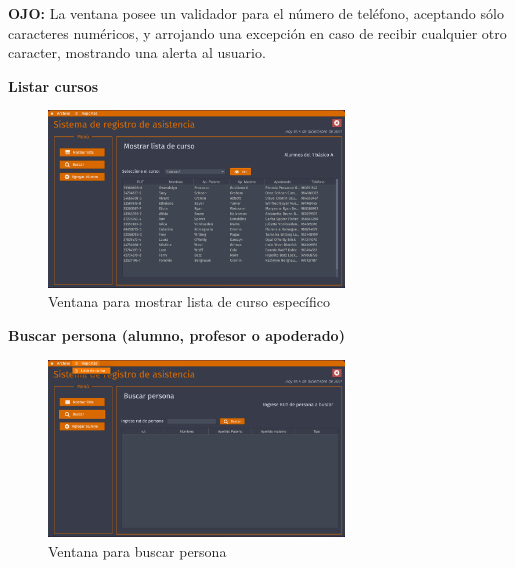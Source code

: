 \textbf{OJO:} La ventana posee un validador para el número de teléfono, aceptando sólo caracteres numéricos, y arrojando una excepción en caso de recibir cualquier otro caracter, mostrando una alerta al usuario.


\clearpage

\textbf{Listar cursos}

\begin{figure}[h]
    \centering
    \includegraphics[width=0.7\textwidth]{contents/img/gui/img13}
    \caption{Ventana para mostrar lista de curso específico}
    \label{fig:gui13}
\end{figure}

\textbf{Buscar persona (alumno, profesor o apoderado)}

\begin{figure}[h]
    \centering
    \includegraphics[width=0.7\textwidth]{contents/img/gui/img14}
    \caption{Ventana para buscar persona}
    \label{fig:gui14}
\end{figure}


